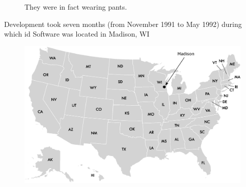 \documentclass[book.tex]{subfiles}
\begin{document}
\begin{figure}[H]
\centering
\caption{They were in fact wearing pants.}
\label{fig:id_team_1993}
\end{figure}


Development took seven months (from November 1991 to May 1992) during which id Software was located in Madison, WI
\begin{figure}[H]
\centering
 \includegraphics[width=\textwidth]{map/usa-id-software.eps}
 \end{figure}
\end{document}
